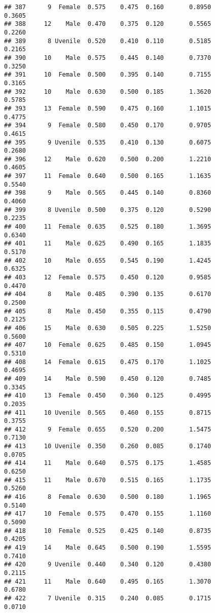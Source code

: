 \documentclass[
]{article}
\begin{document}
\begin{verbatim}
## 387      9  Female  0.575    0.475  0.160       0.8950         0.3605
## 388     12    Male  0.470    0.375  0.120       0.5565         0.2260
## 389      8 Uvenile  0.520    0.410  0.110       0.5185         0.2165
## 390     10    Male  0.575    0.445  0.140       0.7370         0.3250
## 391     10  Female  0.500    0.395  0.140       0.7155         0.3165
## 392     10    Male  0.630    0.500  0.185       1.3620         0.5785
## 393     13  Female  0.590    0.475  0.160       1.1015         0.4775
## 394      9  Female  0.580    0.450  0.170       0.9705         0.4615
## 395      9 Uvenile  0.535    0.410  0.130       0.6075         0.2680
## 396     12    Male  0.620    0.500  0.200       1.2210         0.4605
## 397     11  Female  0.640    0.500  0.165       1.1635         0.5540
## 398      9    Male  0.565    0.445  0.140       0.8360         0.4060
## 399      8 Uvenile  0.500    0.375  0.120       0.5290         0.2235
## 400     11  Female  0.635    0.525  0.180       1.3695         0.6340
## 401     11    Male  0.625    0.490  0.165       1.1835         0.5170
## 402     10    Male  0.655    0.545  0.190       1.4245         0.6325
## 403     12  Female  0.575    0.450  0.120       0.9585         0.4470
## 404      8    Male  0.485    0.390  0.135       0.6170         0.2500
## 405      8    Male  0.450    0.355  0.115       0.4790         0.2125
## 406     15    Male  0.630    0.505  0.225       1.5250         0.5600
## 407     10  Female  0.625    0.485  0.150       1.0945         0.5310
## 408     14  Female  0.615    0.475  0.170       1.1025         0.4695
## 409     14    Male  0.590    0.450  0.120       0.7485         0.3345
## 410     13  Female  0.450    0.360  0.125       0.4995         0.2035
## 411     10 Uvenile  0.565    0.460  0.155       0.8715         0.3755
## 412      9  Female  0.655    0.520  0.200       1.5475         0.7130
## 413     10 Uvenile  0.350    0.260  0.085       0.1740         0.0705
## 414     11    Male  0.640    0.575  0.175       1.4585         0.6250
## 415     11    Male  0.670    0.515  0.165       1.1735         0.5260
## 416      8  Female  0.630    0.500  0.180       1.1965         0.5140
## 417     10  Female  0.575    0.470  0.155       1.1160         0.5090
## 418     10  Female  0.525    0.425  0.140       0.8735         0.4205
## 419     14    Male  0.645    0.500  0.190       1.5595         0.7410
## 420      9 Uvenile  0.440    0.340  0.120       0.4380         0.2115
## 421     11    Male  0.640    0.495  0.165       1.3070         0.6780
## 422      7 Uvenile  0.315    0.240  0.085       0.1715         0.0710

\end{verbatim}
\end{document}
